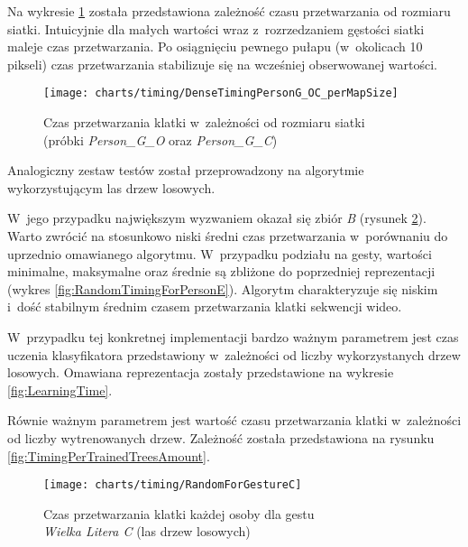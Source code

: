    \newpage
    Na wykresie \ref{fig:DenseTimingPerMapSize} została przedstawiona zależność czasu przetwarzania od rozmiaru siatki. Intuicyjnie dla małych wartości wraz z~rozrzedzaniem gęstości siatki maleje czas przetwarzania. Po osiągnięciu pewnego pułapu (w~okolicach 10 pikseli) czas przetwarzania stabilizuje się na wcześniej obserwowanej wartości.

      \begin{figure}[!ht]
        \centering
        \texttt{[image: charts/timing/DenseTimingPersonG\_OC\_perMapSize]}
        \caption[Czas przetwarzania klatki w~zależności od rozmiaru siatki]
                {Czas przetwarzania klatki w~zależności od rozmiaru siatki\\(próbki \textit{Person\_G\_O} oraz \textit{Person\_G\_C})}
        \label{fig:DenseTimingPerMapSize}
      \end{figure}

    Analogiczny zestaw testów został przeprowadzony na algorytmie wykorzystującym las drzew losowych.

    W~jego przypadku największym wyzwaniem okazał się zbiór \textit{B} (rysunek \ref{fig:RandomForGestureC}). Warto zwrócić na stosunkowo niski średni czas przetwarzania w~porównaniu do uprzednio omawianego algorytmu. W~przypadku podziału na gesty, wartości minimalne, maksymalne oraz średnie są zbliżone do poprzedniej reprezentacji (wykres \ref{fig:RandomTimingForPersonE}). Algorytm charakteryzuje się niskim i~dość stabilnym średnim czasem przetwarzania klatki sekwencji wideo.

    W~przypadku tej konkretnej implementacji bardzo ważnym parametrem jest czas uczenia klasyfikatora przedstawiony w~zależności od liczby wykorzystanych drzew losowych. Omawiana reprezentacja zostały przedstawione na wykresie \ref{fig:LearningTime}.

    Równie ważnym parametrem jest wartość czasu przetwarzania klatki w~zależności od liczby wytrenowanych drzew. Zależność została przedstawiona na rysunku \ref{fig:TimingPerTrainedTreesAmount}.

    \newpage
      \begin{figure}[!ht]
        \centering
        \texttt{[image: charts/timing/RandomForGestureC]}
        \caption[Czas przetwarzania klatki każdej osoby dla gestu C (las drzew losowych)]
                {Czas przetwarzania klatki każdej osoby dla gestu\\\textit{Wielka Litera C} (las drzew losowych)}
        \label{fig:RandomForGestureC}
      \end{figure}

